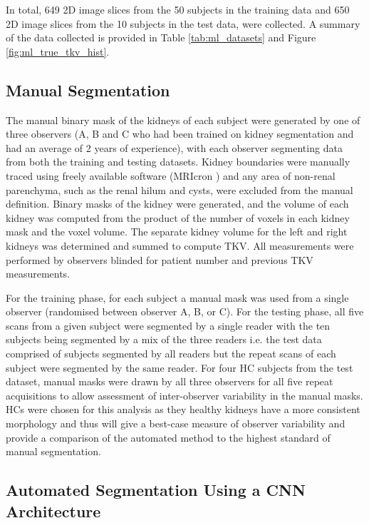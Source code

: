 In total, 649 2D image slices from the 50 subjects in the training data and 650 2D image slices from the 10 subjects in the test data, were collected. A summary of the data collected is provided in Table \ref{tab:ml_datasets} and Figure \ref{fig:ml_true_tkv_hist}.

\subsection{Manual Segmentation}
The manual binary mask of the kidneys of each subject were generated by one of three observers (A, B and C who had been trained on kidney segmentation and had an average of 2 years of experience), with each observer segmenting data from both the training and testing datasets. Kidney boundaries were manually traced using freely available software (MRIcron \cite{rorden_neurolabuscmricron_2021}) and any area of non-renal parenchyma, such as the renal hilum and cysts, were excluded from the manual definition. Binary masks of the kidney were generated, and the volume of each kidney was computed from the product of the number of voxels in each kidney mask and the voxel volume. The separate kidney volume for the left and right kidneys was determined and summed to compute \ac{TKV}. All measurements were performed by observers blinded for patient number and previous \ac{TKV} measurements. 

For the training phase, for each subject a manual mask was used from a single observer (randomised between observer A, B, or C). For the testing phase, all five scans from a given subject were segmented by a single reader with the ten subjects being segmented by a mix of the three readers i.e. the test data comprised of subjects segmented by all readers but the repeat scans of each subject were segmented by the same reader. For four \ac{HC} subjects from the test dataset, manual masks were drawn by all three observers for all five repeat acquisitions to allow assessment of inter-observer variability in the manual masks. \ac{HC}s were chosen for this analysis as they healthy kidneys have a more consistent morphology and thus will give a best-case measure of observer variability and provide a comparison of the automated method to the highest standard of manual segmentation.

\subsection{Automated Segmentation Using a CNN Architecture}

